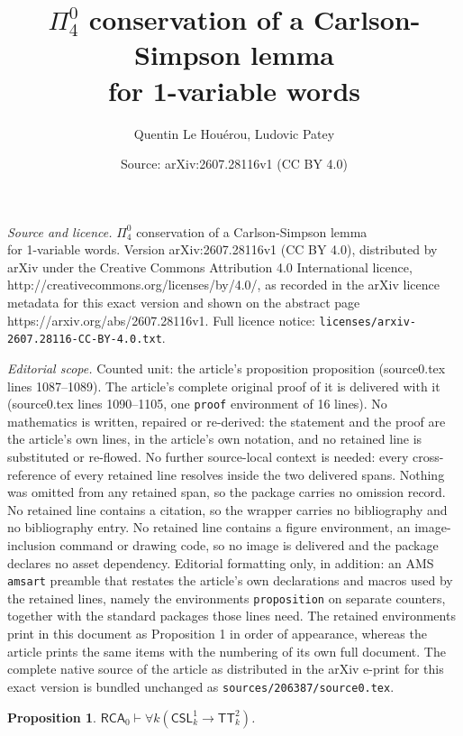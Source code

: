 \documentclass[10pt,a4paper]{amsart}
\title{$\Pi^0_4$ conservation of a Carlson-Simpson lemma\\ for 1-variable words}
\author{Quentin Le Hou\'erou, Ludovic Patey}
\date{Source: arXiv:2607.28116v1 (CC BY 4.0)}
\newtheorem{proposition}{Proposition}
\newcommand{\CSL}{\mathsf{CSL}}
\newcommand{\RCA}{\mathsf{RCA}}
\newcommand{\TT}{\mathsf{TT}}
\begin{document}
\maketitle

\noindent\emph{Source and licence.} $\Pi^0_4$ conservation of a Carlson-Simpson lemma\\ for 1-variable words. Version arXiv:2607.28116v1 (CC BY 4.0), distributed by arXiv under the Creative Commons Attribution 4.0 International licence, http://creativecommons.org/licenses/by/4.0/, as recorded in the arXiv licence metadata for this exact version and shown on the abstract page https://arxiv.org/abs/2607.28116v1. Full licence notice: \texttt{licenses/arxiv-2607.28116-CC-BY-4.0.txt}.\par\smallskip

\noindent\textit{Editorial scope.} Counted unit: the article's proposition proposition (source0.tex lines 1087--1089). The article's complete original proof of it is delivered with it (source0.tex lines 1090--1105, one \texttt{proof} environment of 16 lines). No mathematics is written, repaired or re-derived: the statement and the proof are the article's own lines, in the article's own notation, and no retained line is substituted or re-flowed.  No further source-local context is needed: every cross-reference of every retained line resolves inside the two delivered spans.  Nothing was omitted from any retained span, so the package carries no omission record.  No retained line contains a citation, so the wrapper carries no bibliography and no bibliography entry.  No retained line contains a figure environment, an image-inclusion command or drawing code, so no image is delivered and the package declares no asset dependency.  Editorial formatting only, in addition: an AMS \texttt{amsart} preamble that restates the article's own declarations and macros used by the retained lines, namely the environments \texttt{proposition} on separate counters, together with the standard packages those lines need.  The retained environments print in this document as Proposition 1 in order of appearance, whereas the article prints the same items with the numbering of its own full document.  The complete native source of the article as distributed in the arXiv e-print for this exact version is bundled unchanged as \texttt{sources/206387/source0.tex}.
\begin{proposition}
$\RCA_0 \vdash \forall k (\CSL^1_k \to \TT^2_k)$.
\end{proposition}
\end{document}

